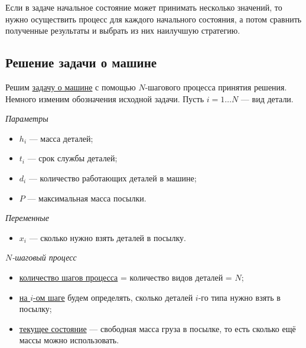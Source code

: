 \remark

Если в задаче начальное состояние может принимать несколько значений, то нужно осуществить процесс для каждого начального состояния, а потом сравнить полученные результаты и выбрать из них наилучшую стратегию.

\subsection{Решение задачи о машине}

Решим \hyperref[pr:car_on_island]{задачу о машине} с помощью $N$-шагового процесса принятия решения. Немного изменим обозначения исходной задачи. Пусть $i = 1 \dots N$ --- вид детали.

\bigskip

\textit{Параметры}

\begin{itemize}[nosep]
	\item $h_i$ --- масса деталей;
	
	\item $t_i$ --- срок службы деталей;
	
	\item $d_i$ --- количество работающих деталей в машине;
	
	\item $P$ --- максимальная масса посылки.
\end{itemize}

\bigskip

\textit{Переменные}

\begin{itemize}[nosep]	
	\item $x_i$ --- сколько нужно взять деталей в посылку.
\end{itemize}

\bigskip

\textit{$N$-шаговый процесс}

\begin{itemize}[nosep]
	\item \underline{количество шагов процесса} = количество видов деталей = $N$;
	
	\item \underline{на $i$-ом шаге} будем определять, сколько деталей $i$-го типа нужно взять в посылку;
	
	\item \underline{текущее состояние} --- свободная масса груза в посылке, то есть сколько ещё массы можно использовать.
\end{itemize}

